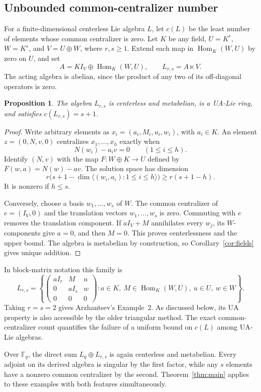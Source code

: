 \documentclass[11pt]{article}
\newtheorem{proposition}[theorem]{Proposition}
\theoremstyle{definition}
\DeclareMathOperator{\Hom}{Hom}
\begin{document}
\subsection{Unbounded common-centralizer number}
For a finite-dimensional centerless Lie algebra $L$, let $c(L)$ be the least number of elements whose common centralizer is zero. Let $K$ be any field, $U=K^r$, $W=K^s$, and $V=U\oplus W$, where $r,s\ge1$. Extend each map in $\Hom_K(W,U)$ by zero on $U$, and set
\[
 A=K I_V\oplus\Hom_K(W,U),\qquad L_{r,s}=A\ltimes V.
\]
The acting algebra is abelian, since the product of any two of its off-diagonal operators is zero.

\begin{proposition}\label{prop:centralizers}
The algebra $L_{r,s}$ is centerless and metabelian, is a UA-Lie ring, and satisfies $c(L_{r,s})=s+1$.
\end{proposition}
\begin{proof}
Write arbitrary elements as $x_i=(a_i,M_i,u_i,w_i)$, with $a_i\in K$. An element $z=(0,N,v,0)$ centralizes $x_1,\ldots,x_h$ exactly when
\[
 N(w_i)-a_iv=0\qquad(1\le i\le h).
\]
Identify $(N,v)$ with the map $F:W\oplus K\to U$ defined by $F(w,a)=N(w)-av$. The solution space has dimension
\[
 r\bigl(s+1-\dim\langle(w_i,a_i):1\le i\le h\rangle\bigr)
 \ge r(s+1-h).
\]
It is nonzero if $h\le s$.

Conversely, choose a basis $w_1,\ldots,w_s$ of $W$. The common centralizer of $e=(I_V,0)$ and the translation vectors $w_1,\ldots,w_s$ is zero. Commuting with $e$ removes the translation component. If $aI_V+M$ annihilates every $w_j$, its $W$-components give $a=0$, and then $M=0$. This proves centerlessness and the upper bound. The algebra is metabelian by construction, so Corollary~\ref{cor:fields} gives unique addition.
\end{proof}

In block-matrix notation this family is
\[
 L_{r,s}=\left\{
 \begin{pmatrix}
 aI_r&M&u\\0&aI_s&w\\0&0&0
 \end{pmatrix}:a\in K,\ M\in\Hom_K(W,U),\ u\in U,\ w\in W
 \right\}.
\]
Taking $r=s=2$ gives Arzhantsev's Example~2. As discussed below, its UA property is also accessible by the older triangular method. The exact common-centralizer count quantifies the failure of a uniform bound on $c(L)$ among UA-Lie algebras.

Over $\mathbb F_q$, the direct sum $L_q\oplus L_{r,s}$ is again centerless and metabelian. Every adjoint on its derived algebra is singular by the first factor, while any $s$ elements have a nonzero common centralizer by the second. Theorem~\ref{thm:main} applies to these examples with both features simultaneously.
\end{document}
